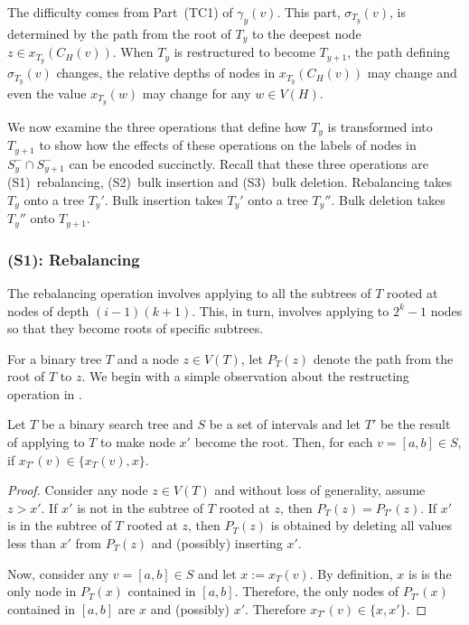\documentclass[kpfonts]{patmorin}
\begin{document}
The difficulty comes from Part~(TC1) of $\gamma_y(v)$.  This part, $\sigma_{T_y}(v)$, is determined by the path from the root of $T_y$ to the deepest node $z\in x_{T_y}(C_H(v))$.  When $T_y$ is restructured to become $T_{y+1}$, the path defining $\sigma_{T_y}(v)$ changes, the relative depths of nodes in $x_{T_y}(C_H(v))$ may change and even the value $x_{T_y}(w)$ may change for any $w\in V(H)$.  

We now examine the three operations that define how $T_y$ is transformed into $T_{y+1}$ to show how the effects of these operations on the labels of nodes in $S^-_y\cap S^-_{y+1}$ can be encoded succinctly.  Recall that these three operations are (S1)~rebalancing, (S2)~bulk insertion and (S3)~bulk deletion.  
Rebalancing takes $T_y$ onto a tree $T_y'$. Bulk insertion takes $T_y'$ onto a tree $T_y''$.  Bulk deletion takes $T_y''$ onto $T_{y+1}$.


\subsubsection{(S1): Rebalancing}

The rebalancing operation involves applying  to all the subtrees of $T$ rooted at nodes of depth $(i-1)(k+1)$.  This, in turn, involves applying  to $2^k-1$ nodes so that they become roots of specific subtrees.

For a binary tree $T$ and a node $z\in V(T)$, let $P_T(z)$ denote the path from the root of $T$ to $z$.  We begin with a simple observation about the restructing operation in .

\begin{obs}
  Let $T$ be a binary search tree and $S$ be a set of intervals and let $T'$ be the result of applying  to $T$ to make node $x'$ become the root.  Then, for each $v=[a,b]\in S$, if $x_{T'}(v)\in\{x_T(v), x\}$.
\end{obs}

\begin{proof}
  Consider any node $z\in V(T)$ and without loss of generality, assume $z>x'$. 
  If $x'$ is not in the subtree of $T$ rooted at $z$, then $P_T(z)=P_{T'}(z)$.  If $x'$ is in the subtree of $T$ rooted at $z$, then $P_T(z)$ is obtained by deleting all values less than $x'$ from $P_T(z)$ and (possibly) inserting $x'$.
  
  Now, consider any $v=[a,b]\in S$ and let $x:=x_T(v)$. By definition, $x$ is is the only node in $P_T(x)$ contained in $[a,b]$. Therefore, the only nodes of $P_{T'}(x)$ contained in $[a,b]$ are $x$ and (possibly) $x'$.  Therefore $x_{T'}(v)\in \{x,x'\}$.
\end{proof}
\end{document}

